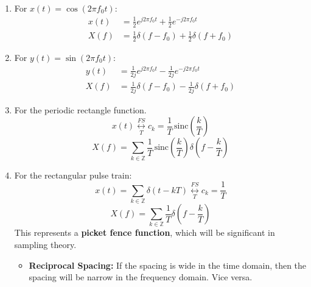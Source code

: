 \begin{example}
    \begin{enumerate}
        \item For \( x(t) = \cos(2 \pi f_0 t) \):
           \begin{align*}
               x(t) &= \frac{1}{2} e^{j 2 \pi f_0 t} + \frac{1}{2} e^{-j 2 \pi f_0 t} \\
               X(f) &= \frac{1}{2} \delta(f - f_0) + \frac{1}{2} \delta(f + f_0)
           \end{align*}
        
        \item For \( y(t) = \sin(2 \pi f_0 t) \):
           \begin{align*}
               y(t) &= \frac{1}{2j} e^{j 2 \pi f_0 t} - \frac{1}{2j} e^{-j 2 \pi f_0 t} \\
               X(f) &= \frac{1}{2j} \delta(f - f_0) - \frac{1}{2j} \delta(f + f_0)
           \end{align*}
        
        \item For the periodic rectangle function.
        \[
        x(t) \underset{T}{\overset{FS}{\longleftrightarrow}} c_k = \frac{1}{T} \, \text{sinc} \left( \frac{k}{T} \right)
        \]
        \[
        X(f) = \sum_{k \in \mathbb{Z}} \frac{1}{T} \, \text{sinc} \left( \frac{k}{T} \right) \delta \left( f - \frac{k}{T} \right)
        \]

        \item For the rectangular pulse train:
           \[
           x(t) = \sum_{k \in \mathbb{Z}} \delta(t - kT) \underset{T}{\overset{FS}{\longleftrightarrow}} c_k = \frac{1}{T}
           \]
           \[
           X(f) = \sum_{k \in \mathbb{Z}} \frac{1}{T} \delta\left(f - \frac{k}{T}\right)
           \]
           This represents a \textbf{picket fence function}, which will be significant in sampling theory.
           \begin{itemize}
            \item \textbf{Reciprocal Spacing:} If the spacing is wide in the time domain, then the spacing will be narrow in the frequency domain. Vice versa.
           \end{itemize}
    \end{enumerate}
\end{example}

